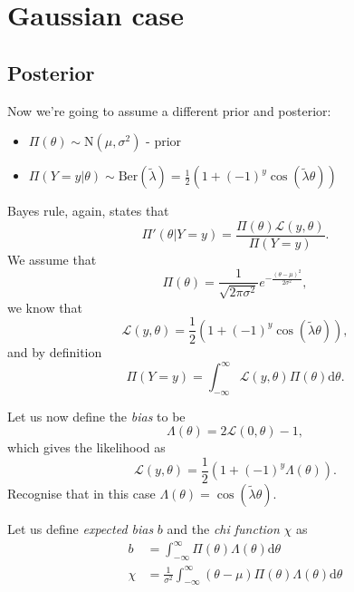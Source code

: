 \documentclass[]{report}
\begin{document}
\section{Gaussian case}
\subsection{Posterior}
Now we're going to assume a different prior and posterior:

\begin{itemize}
	\item $\Pi(\theta) \sim \text{N}(\mu, \sigma^2)$ - prior
	\item $\Pi(Y=y | \theta) \sim \text{Ber}(\tilde{\lambda}) = \frac{1}{2}(1 + (-1)^{y} \cos(\tilde{\lambda} \theta))$
\end{itemize}
Bayes rule, again, states that
\begin{equation}
    \Pi'(\theta|Y = y) = \frac{\Pi(\theta) \mathcal{L} (y, \theta)}{\Pi(Y=y)}.
\end{equation}
We assume that
\begin{equation}
    \Pi(\theta) = \frac{1}{\sqrt{2\pi \sigma^2}} e^{-\frac{(\theta - \mu)^2}{2\sigma^2}},
\end{equation}
we know that
\begin{equation}
    \mathcal{L} (y, \theta) = \frac{1}{2}(1 + (-1)^{y} \cos(\tilde{\lambda} \theta)),
\end{equation}
and by definition
\begin{equation}
\label{eq:normalisation-factor}
    \Pi(Y=y) = \int_{-\infty}^{\infty} \mathcal{L}(y, \theta) \Pi(\theta) \text{d}\theta.
\end{equation}

Let us now define the \textit{bias} to be
\begin{equation}
    \Lambda ( \theta) = 2 \mathcal{L} (0, \theta) - 1,
\end{equation}
which gives the likelihood as
\begin{equation}
    \mathcal{L} (y, \theta) = \frac{1}{2}(1 + (-1)^{y} \Lambda(\theta)).
\end{equation}
Recognise that in this case $\Lambda(\theta) = \cos(\tilde{\lambda} \theta)$.


Let us define \textit{expected bias} $b$ and the \textit{chi function} $\chi$ as
\begin{align}
\label{eq:b}
    b &= \int_{-\infty}^{\infty} \Pi(\theta) \Lambda (\theta) \text{d} \theta\\
\label{eq:chi}
    \chi &= \frac{1}{\sigma^2} \int_{-\infty}^{\infty} (\theta - \mu)\Pi(\theta) \Lambda (\theta) \text{d} \theta
\end{align}
\end{document}
